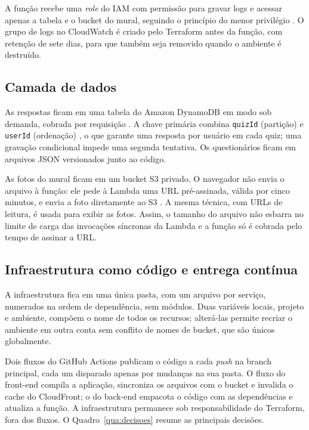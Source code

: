 \documentclass[article, 12pt, oneside, a4paper, english, brazil, sumario=tradicional]{abntex2}
\begin{document}
A função recebe uma \textit{role} do IAM com permissão para gravar logs e acessar apenas a tabela e o bucket do mural, seguindo o princípio do menor privilégio \cite{awsiam}. O grupo de logs no CloudWatch é criado pelo Terraform antes da função, com retenção de sete dias, para que também seja removido quando o ambiente é destruído.

\subsection{Camada de dados}

As respostas ficam em uma tabela do Amazon DynamoDB em modo sob demanda, cobrada por requisição \cite{awsondemand}. A chave primária combina \texttt{quizId} (partição) e \texttt{userId} (ordenação) \cite{awsdynamo}, o que garante uma resposta por usuário em cada quiz; uma gravação condicional impede uma segunda tentativa. Os questionários ficam em arquivos JSON versionados junto ao código.

As fotos do mural ficam em um bucket S3 privado. O navegador não envia o arquivo à função: ele pede à Lambda uma URL pré-assinada, válida por cinco minutos, e envia a foto diretamente ao S3 \cite{awspresigned}. A mesma técnica, com URLs de leitura, é usada para exibir as fotos. Assim, o tamanho do arquivo não esbarra no limite de carga das invocações síncronas da Lambda \cite{awslambdaquotas} e a função só é cobrada pelo tempo de assinar a URL.

\subsection{Infraestrutura como código e entrega contínua}

A infraestrutura fica em uma única pasta, com um arquivo por serviço, numerados na ordem de dependência, sem módulos. Duas variáveis locais, projeto e ambiente, compõem o nome de todos os recursos; alterá-las permite recriar o ambiente em outra conta sem conflito de nomes de bucket, que são únicos globalmente.

Dois fluxos do GitHub Actions publicam o código a cada \textit{push} na branch principal, cada um disparado apenas por mudanças na sua pasta. O fluxo do front-end compila a aplicação, sincroniza os arquivos com o bucket e invalida o cache do CloudFront; o do back-end empacota o código com as dependências e atualiza a função. A infraestrutura permanece sob responsabilidade do Terraform, fora dos fluxos. O Quadro~\ref{qua:decisoes} resume as principais decisões.
\end{document}
